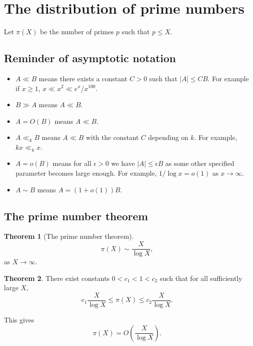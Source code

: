 \documentclass{article}
\newcommand{\rb}[1]{\left( #1 \right)}
\newcommand{\abs}[1]{\left\lvert #1 \right\rvert}
\theoremstyle{definition}\newtheorem{definition}{Definition}
\theoremstyle{definition}\newtheorem{remark}[definition]{Remark}
\theoremstyle{definition}\newtheorem*{example}{Example}
\theoremstyle{definition}\newtheorem*{note}{Note}
\newtheorem{theorem}[definition]{Theorem}
\begin{document}
\pagebreak

\section{The distribution of prime numbers}

Let $ \pi\rb{X} $ be the number of primes $ p $ such that $ p \le X $.

\subsection{Reminder of asymptotic notation}

\begin{itemize}
\item $ A \ll B $ means there exists a constant $ C > 0 $ such that $ \abs{A} \le CB $. For example if $ x \ge 1 $, $ x \ll x^2 \ll e^x / x^{100} $.
\item $ B \gg A $ means $ A \ll B $.
\item $ A = O\rb{B} $ means $ A \ll B $.
\item $ A \ll_k B $ means $ A \ll B $ with the constant $ C $ depending on $ k $. For example, $ kx \ll_k x $.
\item $ A = o\rb{B} $ means for all $ \epsilon > 0 $ we have $ \abs{A} \le \epsilon B $ as some other specified parameter becomes large enough. For example, $ 1 / \log x = o\rb{1} $ as $ x \to \infty $.
\item $ A \sim B $ means $ A = \rb{1 + o\rb{1}}B $.
\end{itemize}

\subsection{The prime number theorem}

\begin{theorem}[The prime number theorem]
$$ \pi\rb{X} \sim \dfrac{X}{\log X}, $$
as $ X \to \infty $.
\end{theorem}

\begin{theorem}
There exist constants $ 0 < c_1 < 1 < c_2 $ such that for all sufficiently large $ X $,
$$ c_1\dfrac{X}{\log X} \le \pi\rb{X} \le c_2\dfrac{X}{\log X}. $$
\end{theorem}

This gives
$$ \pi\rb{X} = O\rb{\dfrac{X}{\log X}}. $$

\end{document}
